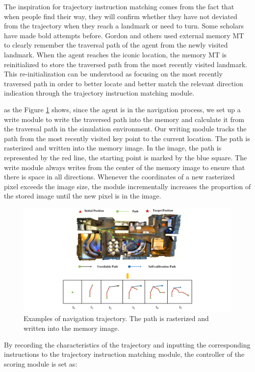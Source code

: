 The inspiration for trajectory instruction matching comes from the fact that when people find their way, they will confirm whether they have not deviated from the trajectory when they reach a landmark or need to turn. Some scholars have made bold attempts before. Gordon and others used external memory MT to clearly remember the traversal path of the agent from the newly visited landmark. When the agent reaches the iconic location, the memory MT is reinitialized to store the traversed path from the most recently visited landmark. This re-initialization can be understood as focusing on the most recently traversed path in order to better locate and better match the relevant direction indication through the trajectory instruction matching module.

as the Figure \ref{image06} shows, since the agent is in the navigation process, we set up a write module to write the traversed path into the memory and calculate it from the traversal path in the simulation environment. Our writing module tracks the path from the most recently visited key point to the current location. The path is rasterized and written into the memory image. In the image, the path is represented by the red line, the starting point is marked by the blue square. The write module always writes from the center of the memory image to ensure that there is space in all directions. Whenever the coordinates of a new rasterized pixel exceeds the image size, the module incrementally increases the proportion of the stored image until the new pixel is in the image.

\begin{figure}
	\centering
	\includegraphics[scale=1]{image06.png}
	\caption{Examples of navigation trajectory. The path is rasterized and written into the memory image.}
	\label{image06}
\end{figure}

By recording the characteristics of the trajectory and inputting the corresponding instructions to the trajectory instruction matching module, the controller of the scoring module is set as:

